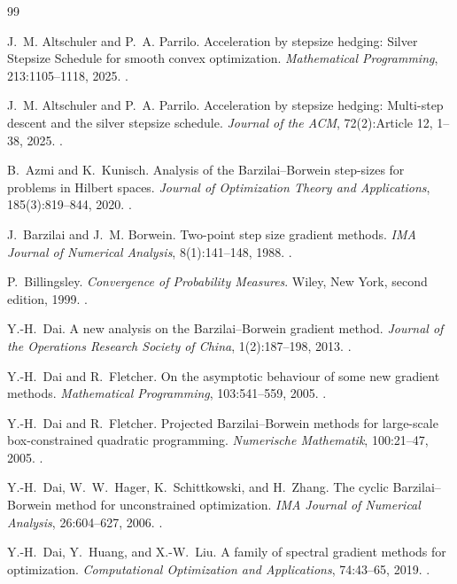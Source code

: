 \begin{thebibliography}{99}
\raggedright

J.~M. Altschuler and P.~A. Parrilo.
Acceleration by stepsize hedging: Silver Stepsize Schedule for smooth convex
optimization.
\emph{Mathematical Programming}, 213:1105--1118, 2025.
.

J.~M. Altschuler and P.~A. Parrilo.
Acceleration by stepsize hedging: Multi-step descent and the silver
stepsize schedule.
\emph{Journal of the ACM}, 72(2):Article 12, 1--38, 2025.
.

B.~Azmi and K.~Kunisch.
Analysis of the Barzilai--Borwein step-sizes for problems in Hilbert spaces.
\emph{Journal of Optimization Theory and Applications}, 185(3):819--844, 2020.
.

J.~Barzilai and J.~M. Borwein.
Two-point step size gradient methods.
\emph{IMA Journal of Numerical Analysis}, 8(1):141--148, 1988.
.

P.~Billingsley.
\emph{Convergence of Probability Measures}.
Wiley, New York, second edition, 1999.
.

Y.-H.~Dai.
A new analysis on the Barzilai--Borwein gradient method.
\emph{Journal of the Operations Research Society of China}, 1(2):187--198, 2013.
.

Y.-H.~Dai and R.~Fletcher.
On the asymptotic behaviour of some new gradient methods.
\emph{Mathematical Programming}, 103:541--559, 2005.
.

Y.-H.~Dai and R.~Fletcher.
Projected Barzilai--Borwein methods for large-scale box-constrained quadratic programming.
\emph{Numerische Mathematik}, 100:21--47, 2005.
.

Y.-H.~Dai, W.~W.~Hager, K.~Schittkowski, and H.~Zhang.
The cyclic Barzilai--Borwein method for unconstrained optimization.
\emph{IMA Journal of Numerical Analysis}, 26:604--627, 2006.
.

Y.-H.~Dai, Y.~Huang, and X.-W.~Liu.
A family of spectral gradient methods for optimization.
\emph{Computational Optimization and Applications}, 74:43--65, 2019.
.


\end{thebibliography}

